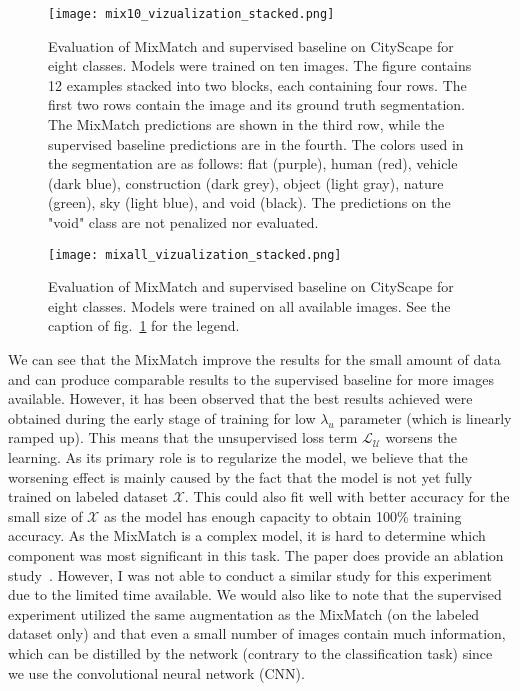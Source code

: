 \begin{figure}[t]
    \centering
    \texttt{[image: mix10\_vizualization\_stacked.png]}
    \caption[Mixmatch CityScape visualization (10)]{Evaluation of MixMatch and supervised baseline on CityScape for eight classes. Models were trained on ten images. 
    The figure contains 12 examples stacked into two blocks, each containing four rows. 
    The first two rows contain the image and its ground truth segmentation. The MixMatch predictions are shown in the third row, 
    while the supervised baseline predictions are in the fourth. \newline
     The colors used in the segmentation are as follows: flat (purple), human (red), vehicle (dark blue), construction (dark grey), 
     object (light gray), nature (green), sky (light blue), and void (black). The predictions on the "void" class are not penalized nor evaluated.}
    \label{fig:mixmatch_visualization_10}
\end{figure}

\begin{figure}[t]
    \centering
    \texttt{[image: mixall\_vizualization\_stacked.png]}
    \caption[Mixmatch CityScape visualization (All)]{Evaluation of MixMatch and supervised baseline on CityScape for eight classes. Models were trained on all available images.
    See the caption of fig.~\ref{fig:mixmatch_visualization_10} for the legend.}
    \label{fig:mixmatch_visualization_all}
\end{figure}

We can see that the MixMatch improve the results for the small amount of data and can produce comparable results to the supervised baseline 
for more images available. However, it has been observed that the best results achieved were obtained during the early stage of training for low $\lambda_u$
parameter (which is linearly ramped up). This means that the unsupervised loss term $\mathcal{L}_{\mathcal{U}}$ worsens the learning. 
As its primary role is to regularize the model, we believe that the worsening effect is mainly caused by the fact that the model is not yet fully 
trained on labeled dataset $\mathcal{X}$. This could also fit well with better accuracy for the small size of $\mathcal{X}$ as the model 
has enough capacity to obtain 100\% training accuracy. As the MixMatch is a complex model, it is hard to determine which 
component was most significant in this task. The paper does provide an ablation study~\cite{mixmatch-2019}. However, I was not able to 
conduct a similar study for this experiment due to the limited time available. We would also like to note that the supervised experiment utilized the same augmentation as 
the MixMatch (on the labeled dataset only) and that even a small number of images contain much information, which can be distilled by the network
(contrary to the classification task) since we use the convolutional neural network (CNN). 

